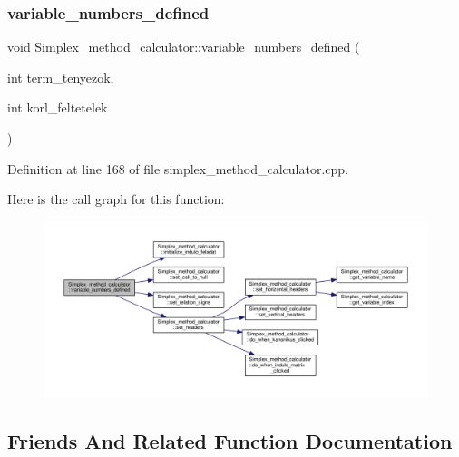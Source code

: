 \subsubsection{\texorpdfstring{variable\+\_\+numbers\+\_\+defined}{variable\_numbers\_defined}}
{\footnotesize\ttfamily void Simplex\+\_\+method\+\_\+calculator\+::variable\+\_\+numbers\+\_\+defined (\begin{DoxyParamCaption}\item[{int}]{term\+\_\+tenyezok,  }\item[{int}]{korl\+\_\+feltetelek }\end{DoxyParamCaption})\hspace{0.3cm}{\ttfamily [slot]}}



Definition at line 168 of file simplex\+\_\+method\+\_\+calculator.\+cpp.

Here is the call graph for this function\+:\nopagebreak
\begin{figure}[H]
\begin{center}
\leavevmode
\includegraphics[width=350pt]{classSimplex__method__calculator_ae8f41cf2c4b813322d238b3f0ed5d415_cgraph}
\end{center}
\end{figure}


\subsection{Friends And Related Function Documentation}
\mbox{\label{classSimplex__method__calculator_a2ae02a3574508e653447a544639a0fe0}} 
